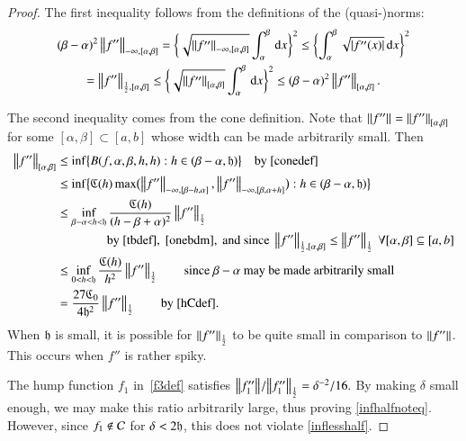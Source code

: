 \documentclass[review]{elsarticle}
\theoremstyle{definition}
\begin{document}
\begin{proof}
The first inequality follows from the definitions of the (quasi-)norms:
\begin{multline} \label{onebdm}
 (\beta - \alpha)^2 \norm[-\infty,{[\alpha,\beta]}]{f''} 
 = \biggl\{\sqrt{\norm[-\infty,{[\alpha,\beta]}]{f''}}  \int_{\alpha}^{\beta} \, \dif x \biggr\}^2 
 \le \biggl\{ \int_{\alpha}^{\beta} \sqrt{\abs{f''(x)}} \, \dif x \biggr\}^2\\
 = \norm[\frac 12,{[\alpha,\beta]}]{f''} 
 \le\biggl\{\sqrt{\norm[{[\alpha,\beta]}]{f''}}  \int_{\alpha}^{\beta} \, \dif x \biggr\}^2 
 \le  (\beta - \alpha)^2 \norm[{[\alpha,\beta]}]{f''}.
\end{multline}

The second inequality comes from the cone definition.  Note that 
$\norm{f''}  = \norm[{[\alpha,\beta]}]{f''}$  for some $[\alpha,\beta] \subset [a,b]$ whose 
width can be made arbitrarily small.  Then
\begin{align*}
\norm[{[\alpha,\beta]}]{f''}
& \le \inf\bigl\{B(f,\alpha,\beta,h,h) : h \in (\beta - \alpha,\fh) \bigr \} \quad \text{by}~\eqref{conedef} \\
& \le  \inf\bigl\{\fC(h) \max\bigl(\norm[-\infty,{[\beta - h, \alpha]}]{f''},
\norm[-\infty,{[\beta, \alpha+h]}]{f''}\bigr) : h \in (\beta - \alpha,\fh) \bigr \} \\
& \le \inf_{\beta - \alpha < h < \fh} \frac{\fC(h)}{(h-\beta+\alpha)^2}\norm[\frac 12]{f''} \\
& \qquad \qquad\text{by}~\eqref{tbdef},~\eqref{onebdm}, \text{ and since }  
\norm[{\frac12,[\alpha,\beta]}]{f''} \le \norm[\frac 12]{f''} \ \forall [\alpha,\beta] 
\subseteq [a,b] \\
& \le \inf_{0 < h < \fh} \frac{\fC(h)}{h^2}\norm[\frac 12]{f''} \qquad 
\text{since $\beta-\alpha$ may be made arbitrarily small}\\
& = \frac{27\fC_0}{4\fh^2}\norm[\frac 12]{f''} \qquad \text{by \eqref{hCdef}}.
\end{align*}
When $\fh$ is small, it is possible for $\norm[\frac 12]{f''} $ to be quite
small in comparison to $\norm{f''}$. This occurs when $f''$ is rather spiky.

The hump function $f_1$ in~\eqref{f3def}  satisfies
$
 {\norm{f_1''}}/{\norm[\frac 12]{f_1''}}  =  { \delta^{-2}}/{16}.
$
By making $\delta$ small enough, we may make this ratio arbitrarily large, thus proving 
\eqref{infhalfnoteq}. However, since $f_1
\notin \cc$ for $\delta < 2\fh$, this does not violate \eqref{inflesshalf}.
\end{proof}
\end{document}
